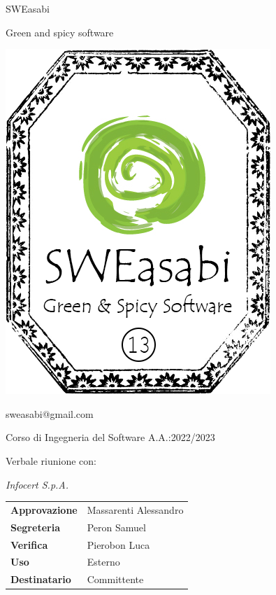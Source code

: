 \documentclass{article}
\begin{document}
\begin{center}
\begin{center}
\begin{minipage}{0.49\linewidth}
\begin{flushright}
\begin{minipage}{0.5\linewidth}
\begin{center}
            \Large SWEasabi
    
            \tiny Green and spicy software
    
            \includegraphics[width=0.67\linewidth]{../../../assets_globali/img/logo_13.png}
            
            \small sweasabi@gmail.com
    
            \end{center}
            \end{minipage}
            \end{flushright}
        \end{minipage}
    \end{center}

    \vspace{2cm}

    \normalsize Corso di Ingegneria del Software A.A.:2022/2023
    
    \Huge Verbale riunione con:
    
    \textit{Infocert S.p.A.}
        
    \vspace{2cm}
    
    \normalsize
    \begin{center}
        \begin{tabularx}{7cm}{l | X}            
            \textbf{Approvazione} & Massarenti Alessandro\\
            \textbf{Segreteria} & Peron Samuel\\
            \textbf{Verifica} & Pierobon Luca\\
            \hline
            \textbf{Uso} & Esterno\\
            \textbf{Destinatario} & Committente\\
        \end{tabularx}
    \end{center}
        
\end{center}
\end{document}

